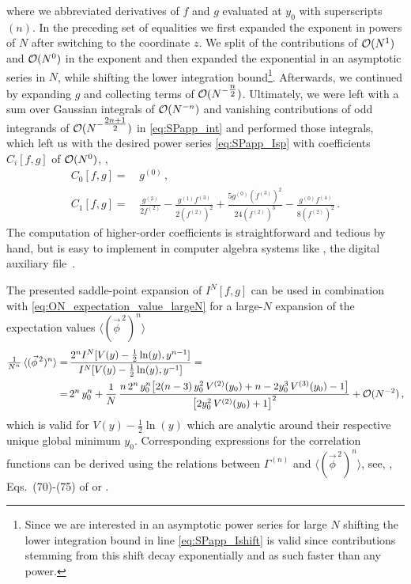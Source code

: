 where we abbreviated  derivatives of $f$ and $g$ evaluated at $y_0$ with superscripts $(n)$.
In the preceding set of equalities we first expanded the exponent in powers of $N$ after switching to the coordinate $z$.
We split of the contributions of $\mathcal{O} ( N^1 )$ and $\mathcal{O} ( N^0 )$ in the exponent and then expanded the exponential in an asymptotic series in $N$, while shifting the lower integration bound\footnote{%
	Since we are interested in an asymptotic power series for large $N$ shifting the lower integration bound in line \eqref{eq:SPapp_Ishift} is valid since contributions stemming from this shift decay exponentially and as such faster than any power.
}.
Afterwards, we continued by expanding $g$ and collecting terms of $\mathcal{O} ( N^{- \tfrac{n}{2}} )$.
Ultimately, we were left with a sum over Gaussian integrals of $\mathcal{O} ( N^{-n} )$ and vanishing contributions of odd integrands of $\mathcal{O} ( N^{- \tfrac{2 n + 1}{2}} )$ in \cref{eq:SPapp_int} and performed those integrals, which left us with the desired power series \eqref{eq:SPapp_Isp} with coefficients $C_i [ f, g ]$ of $\mathcal{O} ( N^0 )$, \eg{},
\begin{subequations}\label{eq:SappCi}
\begin{align}
	C_0 [ f, g ] = \, & g^{(0)} \, ,\\
	C_1 [ f, g ] = \, & \frac{g^{(2)}}{2 f^{(2)}} - \frac{g^{(1)} f^{(3)}}{2 ( f^{(2)} )^2} +\frac{5 g^{(0)} ( f^{(3)} )^2}{24 ( f^{(2)} )^3} - \frac{g^{(0)} f^{(4)}}{8 ( f^{(2)} )^2} \, .
\end{align}
\end{subequations}
The computation of higher-order coefficients is straightforward and tedious by hand, but is easy to implement in computer algebra systems like \WAMXIIwR{}, \cf{} the digital auxiliary file~\cite{Steil:2023zeroDlargeN}.

The presented saddle-point expansion of $I^N [ f, g ]$ can be used in combination with \cref{eq:ON_expectation_value_largeN} for a large-$N$ expansion of the expectation values $\langle ( \vec{\phi}^{\, 2} )^n \rangle$
\begin{align}
	\tfrac{1}{N^n} \, \langle ( \vec{\phi}^{\, 2} )^n \rangle = \, & \frac{2^n I^N [ V ( y ) - \tfrac{1}{2} \ln ( y ), y^{n - 1} ]}{I^N [ V ( y ) - \tfrac{1}{2} \ln ( y ), y^{-1} ]} =\nonumber\\
	= \, & 2^n \, y_0^n + \frac{1}{N} \, \frac{n \, 2^n \, y_0^n \big[ 2 ( n - 3 ) \, y_0^2 \, V^{(2)} ( y_0 ) + n - 2 y_0^3 \, V^{(3)} ( y_0 ) - 1 \big]}{\big[ 2 y_0^2 \, V^{(2)} ( y_0 ) + 1 \big]^2} + \mathcal{O} ( N^{-2} ) \, ,\label{eq:SPapp_series}
\end{align}
which is valid for $V(y)-\tfrac{1}{2}\ln(y)$ which are analytic around their respective unique global minimum $y_0$.
Corresponding expressions for the \ipi{} correlation functions can be derived using the relations between $\Gamma^{(n)}$ and $\langle ( \vec{\phi}^{\, 2} )^n \rangle$, see, \eg{}, Eqs.~(70)-(75) of  or .

